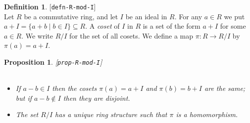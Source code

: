 \documentclass{amsart}
\newcommand{\lbl}[1]{\label{#1}\textup{[\texttt{#1}]}\ \\}
\newcommand{\lbl}{\label}
\newcommand{\st}        {\;|\;}
\newcommand{\sse}       {\subseteq}
\renewcommand{\:}{\colon}
\newtheorem{proposition}[theorem]{Proposition}
\theoremstyle{definition}
\newtheorem{definition}[theorem]{Definition}
\begin{document}
\begin{definition}\lbl{defn-R-mod-I}
 Let $R$ be a commutative ring, and let $I$ be an ideal in $R$.  For
 any $a\in R$ we put $a+I=\{a+b\st b\in I\}\sse R$.  A \emph{coset} of
 $I$ in $R$ is a set of the form $a+I$ for some $a\in R$.  We write
 $R/I$ for the set of all cosets.  We define a map $\pi\:R\to R/I$ by
 $\pi(a)=a+I$.  
\end{definition}

\begin{proposition}\lbl{prop-R-mod-I}\ \\
 \begin{itemize}
  \item[(a)] If $a-b\in I$ then the cosets $\pi(a)=a+I$ and
   $\pi(b)=b+I$ are the same; but if $a-b\not\in I$ then they are
   disjoint. 
  \item[(b)] The set $R/I$ has a unique ring structure such that $\pi$
   is a homomorphism.
 \end{itemize}
\end{proposition}

\end{document}
